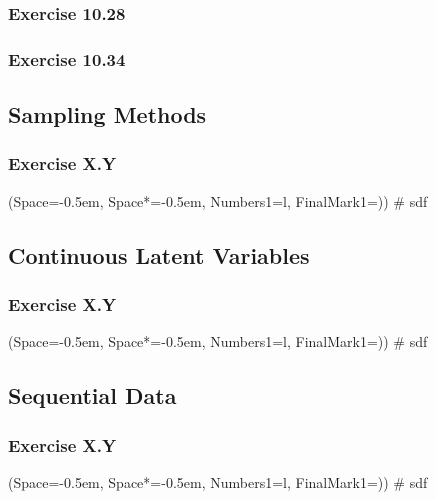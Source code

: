 \documentclass[12pt, a4paper]{article}
\newcommand{\listSpace}{-0.5em}%
\begin{document}
\subsubsection*{Exercise 10.28}

\subsubsection*{Exercise 10.34}



\subsection{Sampling Methods}
\subsubsection*{Exercise X.Y}
\begin{easylist}[enumerate]
	\ListProperties(Space=\listSpace, Space*=\listSpace, Numbers1=l, FinalMark1={)})
	# sdf
\end{easylist}

\subsection{Continuous Latent Variables}
\subsubsection*{Exercise X.Y}
\begin{easylist}[enumerate]
	\ListProperties(Space=\listSpace, Space*=\listSpace, Numbers1=l, FinalMark1={)})
	# sdf
\end{easylist}

\subsection{Sequential Data}
\subsubsection*{Exercise X.Y}
\begin{easylist}[enumerate]
	\ListProperties(Space=\listSpace, Space*=\listSpace, Numbers1=l, FinalMark1={)})
	# sdf
\end{easylist}
\end{document}
